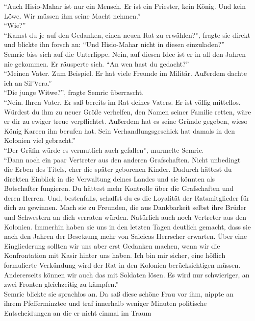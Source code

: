 ``Auch Hisio-Mahar ist nur ein Mensch. Er ist ein Priester, kein König. Und kein Löwe. Wir müssen 
ihm seine Macht nehmen.''\\
``Wie?''\\
``Kamst du je auf den Gedanken, einen neuen Rat zu erwählen?'', fragte sie direkt und blickte ihn 
forsch an: ``Und Hisio-Mahar nicht in diesen einzuladen?''\\
Semric biss sich auf die Unterlippe. Nein, auf diesen Idee ist er in all den Jahren nie gekommen. 
Er räusperte sich. ``An wen hast du gedacht?''\\
``Meinen Vater. Zum Beispiel. Er hat viele Freunde im Militär. Außerdem dachte ich an Sil'Vera.''\\
``Die junge Witwe?'', fragte Semric überrascht.\\
``Nein. Ihren Vater. Er saß bereits im Rat deines Vaters. Er ist völlig mittellos. Würdest du ihm 
zu neuer Größe verhelfen, den Namen seiner Familie retten, wäre er dir zu ewiger treue 
verpflichtet. Außerdem hat es seine Gründe gegeben, wieso König Kareen ihn berufen hat. Sein 
Verhandlungsgeschick hat damals in den Kolonien viel gebracht.''\\
``Der Gräfin würde es vermutlich auch gefallen'', murmelte Semric.\\
``Dann noch ein paar Vertreter aus den anderen Grafschaften. Nicht unbedingt die Erben des Titels, 
eher die später geborenen Kinder. Dadurch hättest du direkten Einblick in die Verwaltung deines 
Landes und sie könnten als Botschafter fungieren. Du hättest mehr Kontrolle über die Grafschaften 
und deren Herren. Und, bestenfalls, schaffst du es die Loyalität der Ratsmitglieder für dich zu 
gewinnen. Mach sie zu Freunden, die aus Dankbarkeit selbst ihre Brüder und Schwestern an dich 
verraten würden. Natürlich auch noch Vertreter aus den Kolonien. Immerhin haben sie uns in den 
letzten Tagen deutlich gemacht, dass sie nach den Jahren der Besetzung mehr von Saleicas 
Herrscher erwarten. Über eine Eingliederung sollten wir uns aber erst Gedanken machen, wenn wir 
die Konfrontation mit Kasir hinter uns haben. Ich bin mir sicher, eine höflich formulierte 
Verkündung wird der Rat in den Kolonien berücksichtigen müssen. Andererseits können wir auch das 
mit Soldaten lösen. Es wird nur schwieriger, an zwei Fronten gleichzeitig zu kämpfen.''\\
Semric blickte sie sprachlos an. Da saß diese schöne Frau vor ihm, nippte an ihrem Pfefferminztee 
und traf innerhalb weniger Minuten politische Entscheidungen an die er nicht einmal im Traum 
